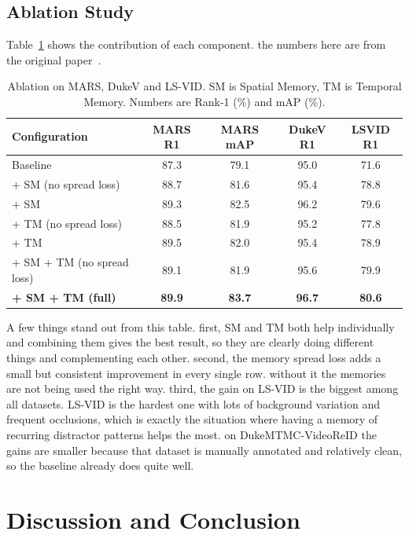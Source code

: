 \documentclass[conference]{IEEEtran}
\begin{document}
\subsection{Ablation Study}

Table~\ref{tab:ablation} shows the contribution of each component. the numbers here are from the original paper~\cite{eom2021stmn}.

\begin{table}[ht]
\centering
\caption{Ablation on MARS, DukeV and LS-VID. SM is Spatial Memory, TM is Temporal Memory. Numbers are Rank-1 (\%) and mAP (\%).}
\renewcommand{\arraystretch}{1.3}
\begin{tabular}{@{}lcccc@{}}
\toprule
\textbf{Configuration} & \textbf{MARS R1} & \textbf{MARS mAP} & \textbf{DukeV R1} & \textbf{LSVID R1} \\
\midrule
Baseline                    & 87.3 & 79.1 & 95.0 & 71.6 \\
+ SM (no spread loss)       & 88.7 & 81.6 & 95.4 & 78.8 \\
+ SM                        & 89.3 & 82.5 & 96.2 & 79.6 \\
+ TM (no spread loss)       & 88.5 & 81.9 & 95.2 & 77.8 \\
+ TM                        & 89.5 & 82.0 & 95.4 & 78.9 \\
+ SM + TM (no spread loss)  & 89.1 & 81.9 & 95.6 & 79.9 \\
\textbf{+ SM + TM (full)}   & \textbf{89.9} & \textbf{83.7} & \textbf{96.7} & \textbf{80.6} \\
\bottomrule
\end{tabular}
\label{tab:ablation}
\end{table}

A few things stand out from this table. first, SM and TM both help individually and combining them gives the best result, so they are clearly doing different things and complementing each other. second, the memory spread loss adds a small but consistent improvement in every single row. without it the memories are not being used the right way. third, the gain on LS-VID is the biggest among all datasets. LS-VID is the hardest one with lots of background variation and frequent occlusions, which is exactly the situation where having a memory of recurring distractor patterns helps the most. on DukeMTMC-VideoReID the gains are smaller because that dataset is manually annotated and relatively clean, so the baseline already does quite well.

\section{Discussion and Conclusion}
\label{sec:conclusion}
\end{document}
